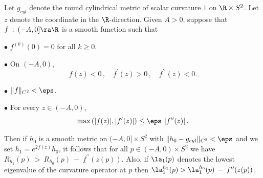 \begin{lemma}
  \label{lem:kl-surgery-pinching-condition-ricci-flow-surgery-lemma}

\label{lemroundoff}
Let $g_{cyl}$ denote the round cylindrical metric  of scalar
curvature $1$ on $\R \times S^2$. Let $z$ denote the coordinate
in the $\R$-direction.
Given $A>0$, suppose that $f \: : \: (-A,0]\ra \R$ is a
smooth function such that

$\bullet$ $f^{(k)}(0)=0$ for all $k\geq 0$.

$\bullet$  On $(-A,0)$,
\begin{equation}
f(z) <0\,,\quad f^\prime(z) >0\,,\quad f^{\prime \prime}(z)<0.
\end{equation}

$\bullet$ $\|f\|_{C^2}<\eps$.

$\bullet$  For every $z \in (-A,0)$,
\begin{equation}
\label{eqnderivcomparision}
\max\left(|f(z)|,\left|f^\prime(z) \right|\right)
\leq \eps\:\left| f^{\prime \prime}(z) \right|.
\end{equation}

Then if  $h_0$ is a smooth metric on $(-A,0] \times S^2$
with $\|h_0-g_{cyl}\|_{C^2}<\eps$  and we set
 $h_1= e^{2f(z)}h_0$, it follows that for all $p \in (-A,0) \times S^2$ we have
$R_{h_1}(p) \: > \: R_{h_0}(p) \: - \: f^{\prime\prime}(z(p))$.
Also, if $\la_1(p)$ denotes the lowest eigenvalue of the curvature operator at $p$ then $\la_1^{h_1}(p)>\la_1^{h_0}(p) \: - \: f^{\prime\prime}(z(p))$.
\end{lemma}
